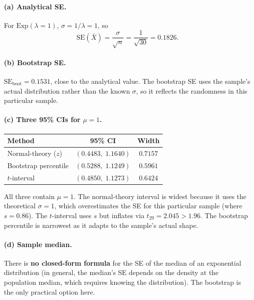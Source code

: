 \documentclass[11pt]{article}
\begin{document}
\paragraph{(a) Analytical SE.}

For $\text{Exp}(\lambda = 1)$, $\sigma = 1/\lambda = 1$, so
\[
  \text{SE}(\bar{X}) = \frac{\sigma}{\sqrt{n}} = \frac{1}{\sqrt{30}} = 0.1826.
\]

\paragraph{(b) Bootstrap SE.}

$\text{SE}_{\text{boot}} = 0.1531$, close to the analytical value. The bootstrap SE uses the sample's actual distribution rather than the known $\sigma$, so it reflects the randomness in this particular sample.

\paragraph{(c) Three 95\% CIs for $\mu = 1$.}

\begin{center}
\begin{tabular}{lcc}
\hline
\textbf{Method} & \textbf{95\% CI} & \textbf{Width} \\
\hline
Normal-theory ($z$) & $(0.4483,\; 1.1640)$ & $0.7157$ \\
Bootstrap percentile & $(0.5288,\; 1.1249)$ & $0.5961$ \\
$t$-interval & $(0.4850,\; 1.1273)$ & $0.6424$ \\
\hline
\end{tabular}
\end{center}

All three contain $\mu = 1$. The normal-theory interval is widest because it uses the theoretical $\sigma = 1$, which overestimates the SE for this particular sample (where $s = 0.86$). The $t$-interval uses $s$ but inflates via $t_{29} = 2.045 > 1.96$. The bootstrap percentile is narrowest as it adapts to the sample's actual shape.

\paragraph{(d) Sample median.}

There is \textbf{no closed-form formula} for the SE of the median of an exponential distribution (in general, the median's SE depends on the density at the population median, which requires knowing the distribution). The bootstrap is the only practical option here.
\end{document}

